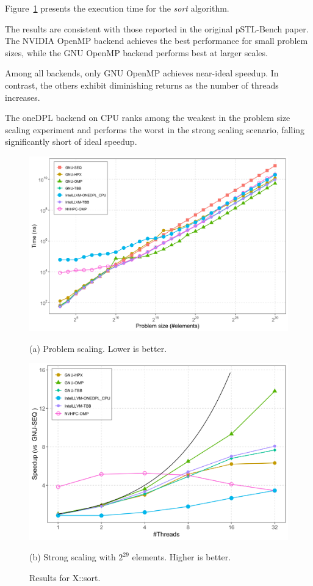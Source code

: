 \documentclass[sigconf]{acmart}
\begin{document}
Figure~\ref{fig:x::sort} presents the execution time for the \textit{sort}
algorithm.

The results are consistent with those reported in the original pSTL-Bench
paper. The NVIDIA OpenMP backend achieves the best performance for small
problem sizes, while the GNU OpenMP backend performs best at larger scales.

Among all backends, only GNU OpenMP achieves near-ideal speedup. In contrast,
the others exhibit diminishing returns as the number of threads increases.

The oneDPL backend on CPU ranks among the weakest in the problem size scaling
experiment and performs the worst in the strong scaling scenario, falling
significantly short of ideal speedup.

\begin{figure}[H]
      \centering
      \begin{minipage}[t]{0.48\linewidth}
            \centering
            \includegraphics[width=\linewidth]{figures/problemSize_time-sort.png}
            \caption*{(a) Problem scaling. Lower is better.}
      \end{minipage}
      \hfill
      \begin{minipage}[t]{0.48\linewidth}
            \centering
            \includegraphics[width=\linewidth]{figures/speedup_threads-sort.png}
            \caption*{(b) Strong scaling with $2^{29}$ elements. Higher is better.}
      \end{minipage}
      \caption{Results for X::sort.}\label{fig:x::sort}
\end{figure}
\end{document}
